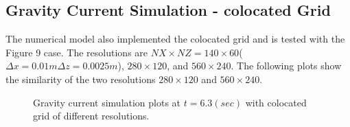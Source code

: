 \normalsize
\subsection{Gravity Current Simulation - colocated Grid}
\label{chapter:NumericalTest-colocated}

The numerical model also implemented the colocated grid and is tested with the Figure 9 case\footnotemark[1] \cite{Maxworthy2002}. The resolutions are $NX \times NZ = 140 \times 60$($\Delta x = 0.01 m \Delta z = 0.0025 m$), $280 \times 120$, and $560 \times 240$. The following plots show the similarity of the two resolutions $280 \times 120$ and $560 \times 240$.


\begin{figure}[htbp]
  \begin{center}
\caption{Gravity current simulation plots at $t=6.3 (sec)$ with colocated grid of different resolutions.}
  \end{center}
\end{figure}

